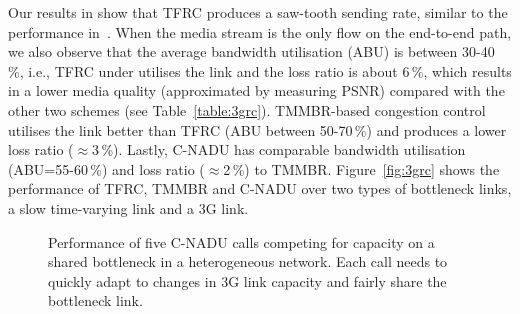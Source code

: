 Our results in  show that TFRC produces a saw-tooth sending
rate, similar to the performance in~\cite{saurin:2006:thesis}. When the media
stream is the only flow on the end-to-end path, we also observe that the average
bandwidth utilisation (ABU) is between 30-40\,\%, i.e., TFRC under utilises the
link and the loss ratio is about 6\,\%, which results in a lower media quality
(approximated by measuring PSNR) compared with the other two schemes (see
Table~\ref{table:3grc}). TMMBR-based congestion control utilises the link
better than TFRC (ABU between 50-70\,\%) and produces a lower loss ratio
($\approx$3\,\%). Lastly, C-NADU has comparable bandwidth utilisation
(ABU=55-60\,\%) and loss ratio ($\approx$2\,\%) to TMMBR.
Figure~\ref{fig:3grc} shows the performance of TFRC, TMMBR and C-NADU over two
types of bottleneck links, a slow time-varying link and a 3G link.


\begin{figure}[!t]
\centerline{
{}
{}
}
\centerline{
{}
{}
}
\caption{Performance of five C-NADU calls competing for
capacity on a shared bottleneck in a heterogeneous network. Each call needs
to quickly adapt to changes in 3G link capacity and fairly share the
bottleneck link.}
\label{fig:hetrc}
\end{figure}

\begin{table}[!t]
\caption{C-NADU: Five calls in a heterogeneous network with end-to-end latency
between 60-120\,\emph{ms} and 0.5\,\% link-layer losses.}
\label{table:hetrc}
\end{table}

